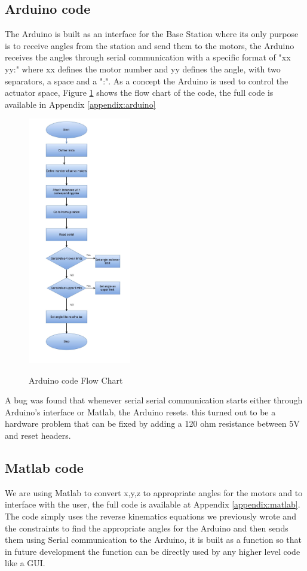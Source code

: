 \documentclass[11pt,a4paper]{report}
\begin{document}
\subsection{Arduino code}
The Arduino is built as an interface for the Base Station where its only purpose is to receive angles from the station and send them to the motors, the Arduino receives the angles through serial communication with a specific format of "xx yy:" where xx defines the motor number and yy defines the angle, with two separators, a space and a ":". As a concept the Arduino is used to control the actuator space, Figure \ref{fig:arduinoFlow} shows the flow chart of the code, the full code is available in Appendix \ref{appendix:arduino}\\
\begin{figure}[h]
\centering
{\includegraphics[width=0.4\textwidth]{Figures/Flow1.jpg}}
\caption{Arduino code Flow Chart}
\label{fig:arduinoFlow}
\end{figure}
A bug was found that whenever serial serial communication starts either through Arduino's interface or Matlab, the Arduino resets. this turned out to be a hardware problem that can be fixed by adding a 120 ohm resistance between 5V and reset headers. \cite{arduinoreset} 
\subsection{Matlab code}
We are using Matlab to convert x,y,z to appropriate angles for the motors and to interface with the user, the full code is available at Appendix \ref{appendix:matlab}.\\
The code simply uses the reverse kinematics equations we previously wrote and the constraints to find the appropriate angles for the Arduino and then sends them using Serial communication to the Arduino, it is built as a function so that in future development the function can be directly used by any higher level code like a GUI.
\end{document}
